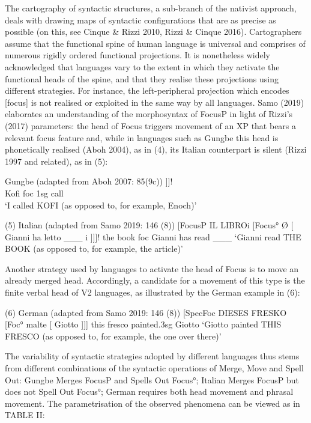 \documentclass[fleqn,10pt]{wlscirep}
\begin{document}
The cartography of syntactic structures, a sub-branch of the nativist approach, deals with
 drawing maps of syntactic configurations that are as precise as possible (on this, see Cinque \& Rizzi 2010, Rizzi \& Cinque 2016). Cartographers assume that the functional spine of human language is universal and comprises of numerous rigidly ordered functional projections. It is nonetheless widely acknowledged that languages vary to the extent in which they activate the functional heads of the spine, and that they realise these projections using different strategies. 
For instance, the left-peripheral projection which encodes [focus] is not realised or exploited in the same way by all languages. Samo (2019) elaborates an understanding of the morphosyntax of FocusP in light of Rizzi’s (2017) parameters: the head of Focus triggers movement of an XP that bears a relevant focus feature and, while in languages such as Gungbe this head is phonetically realised (Aboh 2004), as in (4), its Italian counterpart is silent (Rizzi 1997 and related), as in (5):

\begin{exe}
    \ex Gungbe (adapted from Aboh 2007: 85(9c))
        \gll [\textsubscript{FocusP}  	KÒFÍ\textsubscript{i}   [\textsubscript{Focus^0} 	wè 			[	ùn   		yró		\_\_\_\textsubscript{i}		]]]!\\
        {} Kofi        {} 			foc    {}    	1sg   	call {} {}\\
        \vspace{-3mm}
        \glt ‘I called KOFI (as opposed to, for example, Enoch)’
\end{exe}

(5)  	Italian (adapted from Samo 2019: 146 (8))
			[FocusP 		IL LIBROi    [Focus° 	Ø 		[	Gianni 		ha 		letto 	___ i	]]]!
								the book						foc			Gianni 		has 	read 	___
			‘Gianni read THE BOOK (as opposed to, for example, the article)’	

Another strategy used by languages to activate the head of Focus is to move an already merged head. Accordingly, a candidate for a movement of this type is the finite verbal head of V2 languages, as illustrated by the German example in (6):

(6)		German (adapted from Samo 2019: 146 (8))
			[SpecFoc 	DIESES 	FRESKO 	[Foc° 	malte				[	Giotto ]]] 
								this 			fresco					painted.3sg		Giotto 	
			‘Giotto painted THIS FRESCO (as opposed to, for example, the one over there)’

The variability of syntactic strategies adopted by different languages thus stems from different combinations of the syntactic operations of Merge, Move and Spell Out: Gungbe Merges FocusP and Spells Out Focus°; Italian Merges FocusP but does not Spell Out Focus°; German requires both head movement and phrasal movement. The parametrisation of the observed phenomena can be viewed as in TABLE II:
\end{document}
